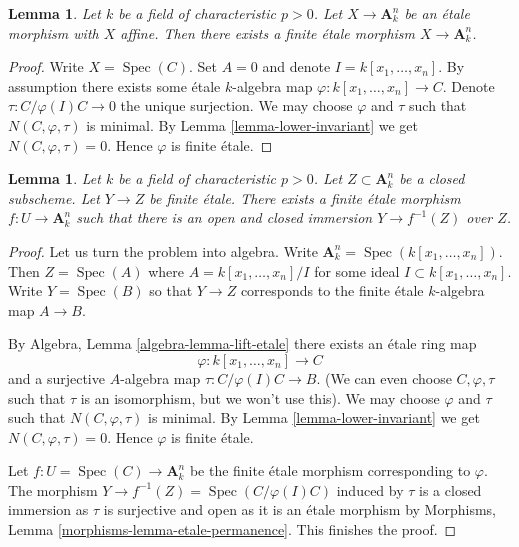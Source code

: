 \documentclass{stacks-project}
\theoremstyle{plain}
\newtheorem{lemma}[subsection]{Lemma}
\theoremstyle{definition}
\theoremstyle{remark}
\numberwithin{equation}{subsection}
\def\Spec{\mathop{\mathrm{Spec}}}
\begin{document}
\begin{lemma}
\label{lemma-affine-etale-over-affine-space}
Let $k$ be a field of characteristic $p > 0$. Let $X \to \mathbf{A}^n_k$ be an
\'etale morphism with $X$ affine. Then there exists a finite \'etale
morphism $X \to \mathbf{A}^n_k$.
\end{lemma}

\begin{proof}
Write $X = \Spec(C)$. Set $A = 0$ and denote $I = k[x_1, \ldots, x_n]$.
By assumption there exists some \'etale $k$-algebra map
$\varphi : k[x_1, \ldots, x_n] \to C$. Denote $\tau : C/\varphi(I)C \to 0$
the unique surjection. We may choose $\varphi$ and $\tau$ such
that $N(C, \varphi, \tau)$ is minimal. By Lemma \ref{lemma-lower-invariant}
we get $N(C, \varphi, \tau) = 0$. Hence $\varphi$ is finite \'etale.
\end{proof}

\begin{lemma}
\label{lemma-dominate-affine-space}
Let $k$ be a field of characteristic $p > 0$. Let $Z \subset \mathbf{A}^n_k$
be a closed subscheme. Let $Y \to Z$ be finite \'etale. There exists a
finite \'etale morphism $f : U \to \mathbf{A}^n_k$ such that
there is an open and closed immersion $Y \to f^{-1}(Z)$ over $Z$.
\end{lemma}

\begin{proof}
Let us turn the problem into algebra. Write
$\mathbf{A}^n_k = \Spec(k[x_1, \ldots, x_n])$.
Then $Z = \Spec(A)$ where $A = k[x_1, \ldots, x_n]/I$
for some ideal $I \subset k[x_1, \ldots, x_n]$.
Write $Y = \Spec(B)$ so that $Y \to Z$ corresponds to
the finite \'etale $k$-algebra map $A \to B$.

\medskip\noindent
By Algebra, Lemma \ref{algebra-lemma-lift-etale}
there exists an \'etale ring map
$$
\varphi : k[x_1, \ldots, x_n] \to C
$$
and a surjective $A$-algebra map $\tau : C/\varphi(I)C \to B$.
(We can even choose $C, \varphi, \tau$ such that $\tau$ is an isomorphism,
but we won't use this). We may choose $\varphi$ and $\tau$ such
that $N(C, \varphi, \tau)$ is minimal. By Lemma \ref{lemma-lower-invariant}
we get $N(C, \varphi, \tau) = 0$. Hence $\varphi$ is finite \'etale.

\medskip\noindent
Let $f : U = \Spec(C) \to \mathbf{A}^n_k$ be the finite \'etale
morphism corresponding to $\varphi$. The morphism
$Y \to f^{-1}(Z) = \Spec(C/\varphi(I)C)$ induced by $\tau$
is a closed immersion as $\tau$ is surjective and open as
it is an \'etale morphism by Morphisms, Lemma
\ref{morphisms-lemma-etale-permanence}. This finishes the proof.
\end{proof}
\end{document}
